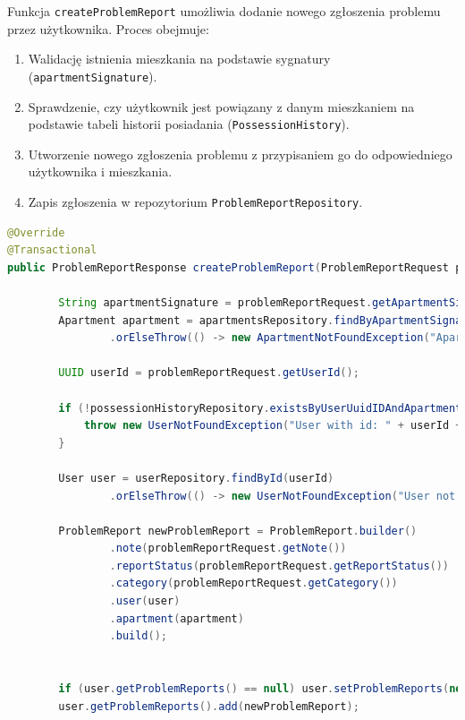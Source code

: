 Funkcja \texttt{createProblemReport} umożliwia dodanie nowego zgłoszenia problemu przez użytkownika. Proces obejmuje:
\begin{enumerate}
    \item Walidację istnienia mieszkania na podstawie sygnatury (\texttt{apartmentSignature}).
    \item Sprawdzenie, czy użytkownik jest powiązany z danym mieszkaniem na podstawie tabeli historii posiadania (\texttt{PossessionHistory}).
    \item Utworzenie nowego zgłoszenia problemu z przypisaniem go do odpowiedniego użytkownika i mieszkania.
    \item Zapis zgłoszenia w repozytorium \texttt{ProblemReportRepository}.
\end{enumerate}

\begin{lstlisting}[language=Java, style=JavaStyle, caption=Tworzenie zgłoszenia problemu.]
@Override
@Transactional
public ProblemReportResponse createProblemReport(ProblemReportRequest problemReportRequest) throws UserNotFoundException, ApartmentNotFoundException {

        String apartmentSignature = problemReportRequest.getApartmentSignature();
        Apartment apartment = apartmentsRepository.findByApartmentSignature(apartmentSignature)
                .orElseThrow(() -> new ApartmentNotFoundException("Apartment not found with id: " + apartmentSignature));

        UUID userId = problemReportRequest.getUserId();

        if (!possessionHistoryRepository.existsByUserUuidIDAndApartmentUuidID(userId, apartment.getUuidID())) {
            throw new UserNotFoundException("User with id: " + userId + " does not have access to apartment with signature: " + apartmentSignature);
        }

        User user = userRepository.findById(userId)
                .orElseThrow(() -> new UserNotFoundException("User not found with id: " + userId));

        ProblemReport newProblemReport = ProblemReport.builder()
                .note(problemReportRequest.getNote())
                .reportStatus(problemReportRequest.getReportStatus())
                .category(problemReportRequest.getCategory())
                .user(user)
                .apartment(apartment)
                .build();


        if (user.getProblemReports() == null) user.setProblemReports(new ArrayList<>());
        user.getProblemReports().add(newProblemReport);


\end{lstlisting}
